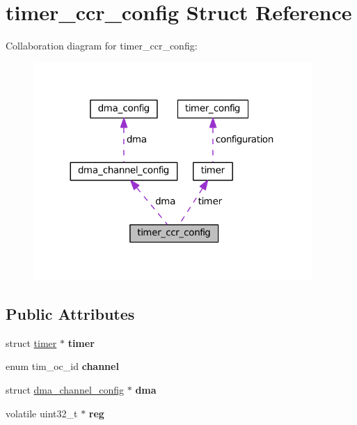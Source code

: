 \hypertarget{structtimer__ccr__config}{}\section{timer\+\_\+ccr\+\_\+config Struct Reference}
\label{structtimer__ccr__config}


Collaboration diagram for timer\+\_\+ccr\+\_\+config\+:
\nopagebreak
\begin{figure}[H]
\begin{center}
\leavevmode
\includegraphics[width=300pt]{structtimer__ccr__config__coll__graph}
\end{center}
\end{figure}
\subsection*{Public Attributes}
\begin{DoxyCompactItemize}
\item 
\hypertarget{structtimer__ccr__config_af228e92c83395be0dff9f27e6ba7711a}{}struct \hyperlink{structtimer}{timer} $\ast$ {\bfseries timer}\label{structtimer__ccr__config_af228e92c83395be0dff9f27e6ba7711a}

\item 
\hypertarget{structtimer__ccr__config_ae497ec8b539565c6fe34b2849989336a}{}enum tim\+\_\+oc\+\_\+id {\bfseries channel}\label{structtimer__ccr__config_ae497ec8b539565c6fe34b2849989336a}

\item 
\hypertarget{structtimer__ccr__config_a1e92f7221c14d90562bd42830fa2427d}{}struct \hyperlink{structdma__channel__config}{dma\+\_\+channel\+\_\+config} $\ast$ {\bfseries dma}\label{structtimer__ccr__config_a1e92f7221c14d90562bd42830fa2427d}

\item 
\hypertarget{structtimer__ccr__config_a3876bca410f69a23790a94f8eb9d73f8}{}volatile uint32\+\_\+t $\ast$ {\bfseries reg}\label{structtimer__ccr__config_a3876bca410f69a23790a94f8eb9d73f8}

\end{DoxyCompactItemize}


